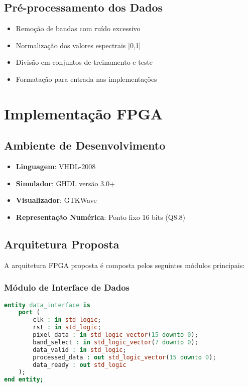 
\subsection{Pré-processamento dos Dados}
\begin{itemize}
    \item Remoção de bandas com ruído excessivo
    \item Normalização dos valores espectrais [0,1]
    \item Divisão em conjuntos de treinamento e teste
    \item Formatação para entrada nas implementações
\end{itemize}

\section{Implementação FPGA}\label{sec:impl_fpga}

\subsection{Ambiente de Desenvolvimento}
\begin{itemize}
    \item \textbf{Linguagem}: VHDL-2008
    \item \textbf{Simulador}: GHDL versão 3.0+
    \item \textbf{Visualizador}: GTKWave
    \item \textbf{Representação Numérica}: Ponto fixo 16 bits (Q8.8)
\end{itemize}

\subsection{Arquitetura Proposta}
A arquitetura FPGA proposta é composta pelos seguintes módulos principais:

\subsubsection{Módulo de Interface de Dados}
\begin{lstlisting}[language=VHDL, caption=Interface de dados FPGA]
entity data_interface is
    port (
        clk : in std_logic;
        rst : in std_logic;
        pixel_data : in std_logic_vector(15 downto 0);
        band_select : in std_logic_vector(7 downto 0);
        data_valid : in std_logic;
        processed_data : out std_logic_vector(15 downto 0);
        data_ready : out std_logic
    );
end entity;
\end{lstlisting}

